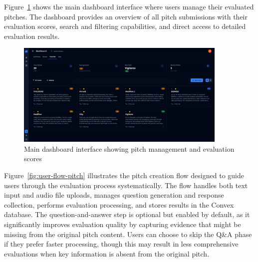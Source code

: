 Figure~\ref{fig:dashboard} shows the main dashboard interface where users manage their evaluated pitches. The dashboard provides an overview of all pitch submissions with their evaluation scores, search and filtering capabilities, and direct access to detailed evaluation results.

\begin{figure}[H]
  \centering
  \includegraphics[width=0.9\textwidth]{img/dashboard}
\caption{Main dashboard interface showing pitch management and evaluation scores}
  \label{fig:dashboard}
\end{figure}

Figure~\ref{fig:user-flow-pitch} illustrates the pitch creation flow designed to guide users through the evaluation process systematically. The flow handles both text input and audio file uploads, manages question generation and response collection, performs evaluation processing, and stores results in the Convex database. The question-and-answer step is optional but enabled by default, as it significantly improves evaluation quality by capturing evidence that might be missing from the original pitch content. Users can choose to skip the Q&A phase if they prefer faster processing, though this may result in less comprehensive evaluations when key information is absent from the original pitch.

